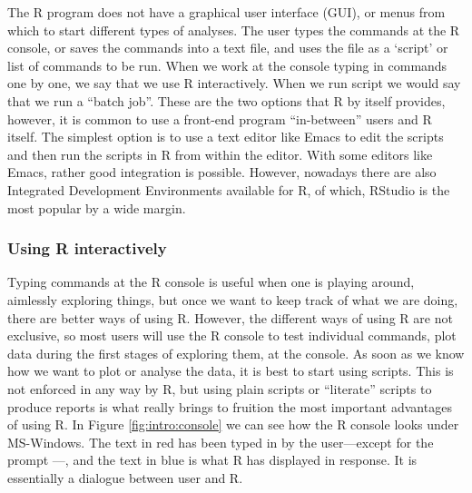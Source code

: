 \documentclass[krantz2,ChapterTOCs]{krantz}\usepackage{knitr}
\begin{document}
The R program does not have a graphical user interface (GUI), or menus from which to start different types of analyses. The user types the commands at the R console, or saves the commands into a text file, and uses the file as a `script' or list of commands to be run. When we work at the console typing in commands one by one, we say that we use R interactively. When we run script we would say that we run a ``batch job''. These are the two options that R by itself provides, however, it is common to use a front-end program ``in-between'' users and R itself. The simplest option is to use a text editor like Emacs to edit the scripts and then run the scripts in R from within the editor. With some editors like Emacs, rather good integration is possible. However, nowadays there are also Integrated Development Environments available for R, of which, RStudio is
the most popular by a wide margin.

\subsubsection{Using R interactively}

Typing commands at the R console is useful when one is playing around, aimlessly exploring things, but once we want to keep track of what we are doing, there are better ways of using R. However, the different ways of using R are not exclusive, so most users will use the R console to test individual commands, plot data during the first stages of exploring them, at the console. As soon as we know how we want to plot or analyse the data, it is best to start using scripts. This is not enforced in any way by R, but using plain scripts or ``literate'' scripts to produce reports is what really brings to fruition the most important advantages of using R. In Figure \ref{fig:intro:console} we can see how the R console looks under MS-Windows. The text in red has been typed in by the user---except for the prompt \code{$>$}---, and the text in blue is what R has displayed in response. It is essentially a dialogue between user and R.
\end{document}
